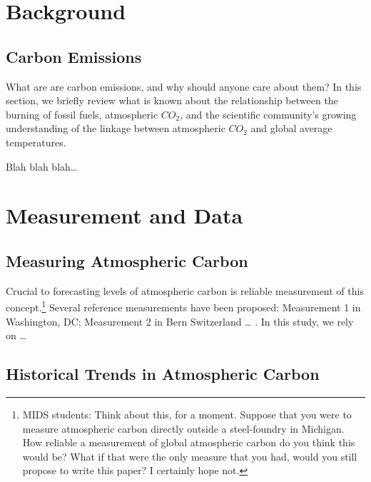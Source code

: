 \documentclass[AER]{AEA}
\begin{document}
\hypertarget{background}{%
\section{Background}\label{background}}

\hypertarget{carbon-emissions}{%
\subsection{Carbon Emissions}\label{carbon-emissions}}

What are are carbon emissions, and why should anyone care about them? In
this section, we briefly review what is known about the relationship
between the burning of fossil fuels, atmospheric \(CO_{2}\), and the
scientific community's growing understanding of the linkage between
atmospheric \(CO_{2}\) and global average temperatures.

Blah blah blah\ldots{}

\hypertarget{measurement-and-data}{%
\section{Measurement and Data}\label{measurement-and-data}}

\hypertarget{measuring-atmospheric-carbon}{%
\subsection{Measuring Atmospheric
Carbon}\label{measuring-atmospheric-carbon}}

Crucial to forecasting levels of atmospheric carbon is reliable
measurement of this
concept.\footnote{MIDS students: Think about this, for a moment. Suppose that you were to measure atmospheric carbon directly outside a steel-foundry in Michigan. How reliable a measurement of global atmospheric carbon do you think this would be? What if that were the only measure that you had, would you still propose to write this paper? I certainly hope not.}
Several reference measurements have been proposed: Measurement 1 in
Washington, DC; Measurement 2 in Bern Switzerland \ldots{} . In this
study, we rely on \ldots{}

\hypertarget{historical-trends-in-atmospheric-carbon}{%
\subsection{Historical Trends in Atmospheric
Carbon}\label{historical-trends-in-atmospheric-carbon}}
\end{document}
